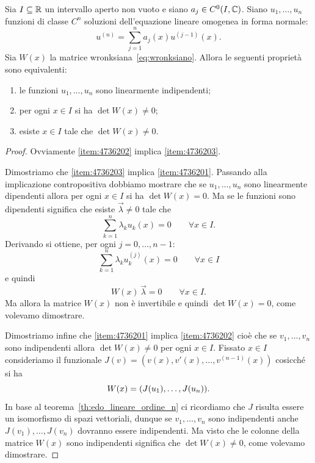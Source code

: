 \begin{theorem}
\label{th:wronksiano}
Sia $I\subseteq \mathbb R$ un intervallo aperto non vuoto e siano $a_j\in C^0(I,\mathbb C)$.
Siano $u_1, \dots, u_n$ funzioni di classe $C^n$ soluzioni
dell'equazione lineare omogenea in forma normale:
\begin{equation}\label{eq:092784}
  u^{(n)} = \sum_{j=1}^n a_j(x) u^{(j-1)}(x).
\end{equation}
Sia $W(x)$ la matrice wronksiana~\eqref{eq:wronksiano}.
Allora le seguenti proprietà sono equivalenti:
\begin{enumerate}
\item \label{item:4736201} le funzioni $u_1,\dots, u_n$ sono linearmente indipendenti;
\item \label{item:4736202} per ogni $x\in I$ si ha $\det W(x)\neq 0$;
\item \label{item:4736203} esiste $x\in I$ tale che $\det W(x)\neq 0$.
\end{enumerate}
\end{theorem}

\begin{proof}
Ovviamente \ref{item:4736202} implica \ref{item:4736203}.

Dimostriamo che \ref{item:4736203} implica \ref{item:4736201}.
Passando alla implicazione contropositiva dobbiamo mostrare che
se $u_1,\dots, u_n$ sono linearmente dipendenti allora per ogni $x\in I$ si ha $\det W(x)=0$. Ma se le funzioni sono dipendenti significa che esiste $\vec \lambda \neq 0$ tale che
\begin{equation}\label{eq:3675893}
\sum_{k=1}^n \lambda_k u_k(x) = 0\qquad \forall x \in I.
\end{equation}
Derivando si ottiene, per ogni $j=0,\dots, n-1$:
\[
\sum_{k=1}^n \lambda_k u_k^{(j)}(x) = 0\qquad \forall x \in I
\]
e quindi
\[
  W(x) \, \vec \lambda = 0 \qquad \forall x\in I.
\]
Ma allora la matrice $W(x)$ non è invertibile e quindi $\det W(x)=0$, come volevamo dimostrare.

Dimostriamo infine che \ref{item:4736201} implica \ref{item:4736202}
cioè che se $v_1, \dots, v_n$ sono indipendenti allora $\det W(x) \neq 0$ per ogni $x\in I$.
Fissato $x\in I$ consideriamo il funzionale $J(v) = (v(x),v'(x), \dots, v^{(n-1)}(x))$ cosicché si ha
\[
  W(x) = {\left( J(u_1), \dots, J(u_n) \right)}.
\]
In base al teorema~\ref{th:edo_lineare_ordine_n} ci ricordiamo che $J$ risulta essere un isomorfismo di spazi vettoriali, dunque se $v_1,\dots,v_n$ sono indipendenti anche $J(v_1),\dots, J(v_n)$ dovranno essere indipendenti.
Ma visto che le colonne della matrice $W(x)$ sono indipendenti significa che $\det W(x)\neq 0$, come volevamo dimostrare.
\end{proof}

